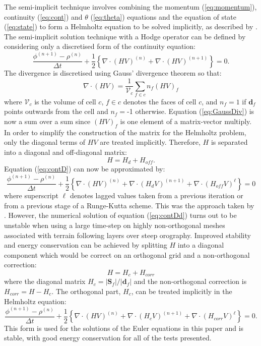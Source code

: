 The semi-implicit technique involves combining the momentum (\ref{eq:momentum}),
continuity (\ref{eq:cont}) and $\theta$ (\ref{eq:theta}) equations
and the equation of state (\ref{eq:state}) to form a Helmholtz equation
to be solved implicitly, as described by \citet{weller-shahrokhi2014}.
The semi-implicit solution technique with a Hodge operator can be
defined by considering only a discretised form of the continuity equation:
\begin{equation}
\frac{\phi^{(n+1)}-\rho^{(n)}}{\Delta t}+\frac{1}{2}\left\{ \nabla\cdot(HV)^{(n)}+\nabla\cdot(HV)^{(n+1)}\right\} =0.\label{eq:contD}
\end{equation}
The divergence is discretised using Gauss' divergence theorem so that:
\begin{equation}
\nabla\cdot\left(HV\right)=\frac{1}{\mathcal{V}_{c}}\sum_{f\in c}n_{f}(HV)_{f}\label{eq:GaussDiv}
\end{equation}
where $\mathcal{V}_{c}$ is the volume of cell $c$, $f\in c$ denotes
the faces of cell $c$, and $n_{f}=1$ if $\mathbf{d}_{f}$ points
outwards from the cell and $n_{f}=$-1 otherwise. Equation (\ref{eq:GaussDiv})
is now a sum over a sum since $(HV)_{f}$ is one element of a matrix-vector
multiply. In order to simplify the construction of the matrix for
the Helmholtz problem, only the diagonal terms of $HV$ are treated
implicitly. Therefore, $H$ is separated into a diagonal and off-diagonal
matrix:
\begin{equation}
H=H_{d}+H_{off}.
\end{equation}
Equation (\ref{eq:contD}) can now be approximated by:
\begin{equation}
\frac{\phi^{(n+1)}-\rho^{(n)}}{\Delta t}+\frac{1}{2}\left\{ \nabla\cdot(HV)^{(n)}+\nabla\cdot(H_{d}V)^{(n+1)}+\nabla\cdot(H_{off}V)^{\ell}\right\} =0\label{eq:contDd}
\end{equation}
where superscript $\ell$ denotes lagged values taken from a previous
iteration or from a previous stage of a Runge-Kutta scheme. This was
the approach taken by \citet{weller-shahrokhi2014}. However, the
numerical solution of equation (\ref{eq:contDd}) turns out to be unstable
when using a large time-step on highly non-orthogonal meshes associated
with terrain following layers over steep orography. Improved stability
and energy conservation can be achieved by splitting $H$ into a diagonal
component which would be correct on an orthogonal grid and a non-orthogonal
correction:
\begin{equation}
H=H_{c}+H_{corr}
\end{equation}
where the diagonal matrix $H_{c}=|\mathbf{S}_{f}|/|\mathbf{d}_{f}|$
and the non-orthogonal correction is $H_{corr}=H-H_{c}$. The orthogonal
part, $H_{c}$, can be treated implicitly in the Helmholtz equation:
\begin{equation}
\frac{\phi^{(n+1)}-\rho^{(n)}}{\Delta t}+\frac{1}{2}\left\{ \nabla\cdot(HV)^{(n)}+\nabla\cdot(H_{c}V)^{(n+1)}+\nabla\cdot(H_{corr}V)^{\ell}\right\} =0.\label{eq:contDc}
\end{equation}
This form is used for the solutions of the Euler equations in this
paper and is stable, with good energy conservation for all of the
tests presented. 
